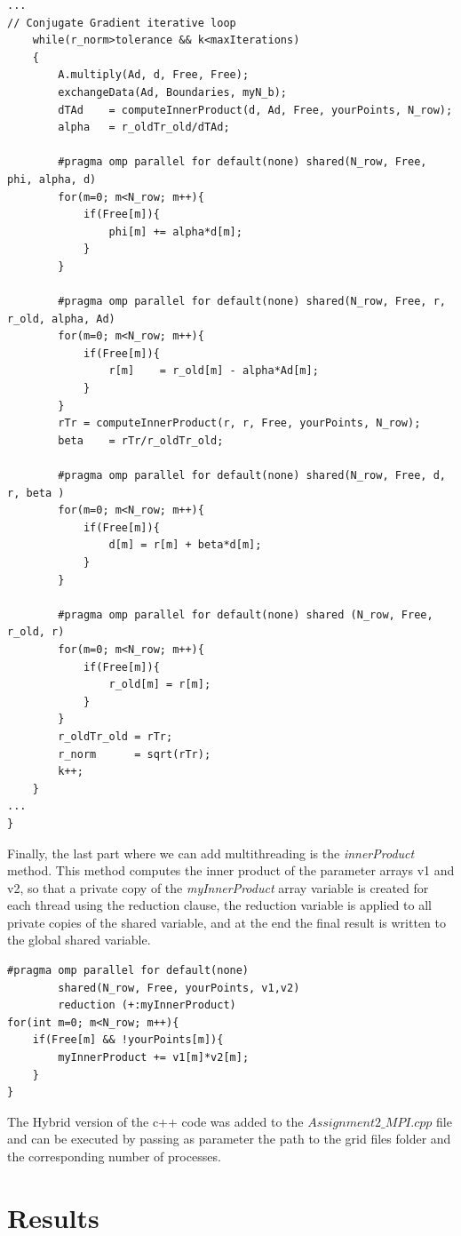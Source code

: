 \documentclass[12pt]{article}
\begin{document}
\begin{lstlisting}[style=MyC++Style]
...
// Conjugate Gradient iterative loop
    while(r_norm>tolerance && k<maxIterations)
    {
    	A.multiply(Ad, d, Free, Free);
		exchangeData(Ad, Boundaries, myN_b);
		dTAd	= computeInnerProduct(d, Ad, Free, yourPoints, N_row);
		alpha  	= r_oldTr_old/dTAd;
        
		#pragma omp parallel for default(none) shared(N_row, Free, phi, alpha, d)
		for(m=0; m<N_row; m++){
			if(Free[m]){
				phi[m] += alpha*d[m];
			}
		}
        
		#pragma omp parallel for default(none) shared(N_row, Free, r, r_old, alpha, Ad)
		for(m=0; m<N_row; m++){
			if(Free[m]){
				r[m]	= r_old[m] - alpha*Ad[m];
			}
		}
		rTr	= computeInnerProduct(r, r, Free, yourPoints, N_row);
		beta  	= rTr/r_oldTr_old;
        
		#pragma omp parallel for default(none) shared(N_row, Free, d, r, beta )
		for(m=0; m<N_row; m++){
			if(Free[m]){
				d[m] = r[m] + beta*d[m];
			}
		}
        
		#pragma omp parallel for default(none) shared (N_row, Free, r_old, r)
		for(m=0; m<N_row; m++){
			if(Free[m]){
				r_old[m] = r[m];
			}
		}
		r_oldTr_old	= rTr;
		r_norm		= sqrt(rTr);
		k++;
	}
...
}
\end{lstlisting}

Finally, the last part where we can add multithreading is the \textit{innerProduct} method. This method computes the inner product of the parameter arrays v1 and v2, so that a private copy of the \textit{myInnerProduct} array variable is created for each thread using the reduction clause, the reduction variable is applied to all private copies of the shared variable, and at the end the final result is written to the global shared variable.

\begin{lstlisting}[style=MyC++Style]
#pragma omp parallel for default(none) 
		shared(N_row, Free, yourPoints, v1,v2) 
		reduction (+:myInnerProduct)
for(int m=0; m<N_row; m++){
	if(Free[m] && !yourPoints[m]){
		myInnerProduct += v1[m]*v2[m];
	}
}
\end{lstlisting}

The Hybrid version of the c++ code was added to the $\textit{Assignment2\_MPI.cpp}$ file and can be executed by passing as parameter the path to the grid files folder and the corresponding number of processes. 
	
	\section{Results}
\end{document}
